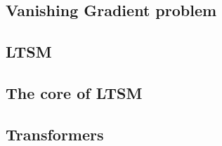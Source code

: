 \subsection{Vanishing Gradient problem}
\subsection{LTSM}
\subsection{The core of LTSM}
\subsection{Transformers}